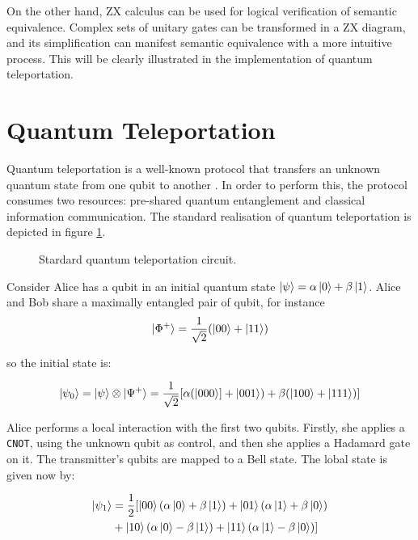 \documentclass[12pt, twoside, openany]{book}
\begin{document}
On the other hand, ZX calculus can be used for logical verification of semantic equivalence. Complex sets of unitary gates can be transformed in a ZX diagram, and its simplification can manifest semantic equivalence with a more intuitive process. This will be clearly illustrated in the implementation of quantum teleportation. \\

\section{Quantum Teleportation}

Quantum teleportation is a well-known protocol that transfers an unknown quantum state from one qubit to another \cite{NielsenChuang2010}. In order to perform this, the protocol consumes two resources: pre-shared quantum entanglement and classical information communication. The standard realisation of quantum teleportation is depicted in figure \ref{fig:teleportation_circuit}.

\begin{figure} [ht]
    \centering
    
    \caption{Stardard quantum teleportation circuit.}
    \label{fig:teleportation_circuit}
\end{figure}

Consider Alice has a qubit in an initial quantum state $\ket{\psi} = \alpha \ket{0} + \beta \ket{1}$. Alice and Bob share a maximally entangled pair of qubit, for instance 
\begin{align*}
    \ket{\Phi ^+} = \frac{1}{\sqrt{2}}(\ket{00} + \ket{11})
\end{align*}

so the initial state is:

\begin{align*}
    \ket{\psi _0} = \ket{\psi} \otimes \ket{\Psi ^+} = \frac{1}{\sqrt{2}} [\alpha (\ket{000}] + \ket{001}) + \beta (\ket{100} + \ket{111})]
\end{align*}

Alice performs a local interaction with the first two qubits. Firstly, she applies a \texttt{CNOT}, using the unknown qubit as control, and then she applies a Hadamard gate on it. The transmitter's qubits are mapped to a Bell state. The lobal state is given now by:

\begin{align*}
    \ket{\psi_1} &= \frac{1}{2} [ \ket{00}(\alpha\ket{0} + \beta\ket{1}) + \ket{01}(\alpha\ket{1} + \beta\ket{0}) \\
    &+ \ket{10}(\alpha\ket{0} - \beta\ket{1}) + \ket{11}(\alpha\ket{1} - \beta\ket{0}) ]
\end{align*}
\end{document}
